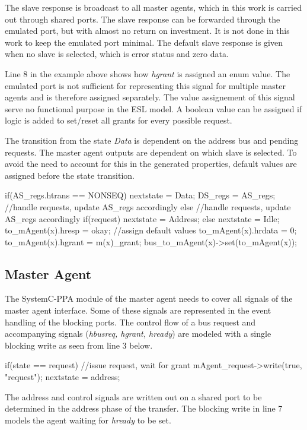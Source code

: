 The slave response is broadcast to all master agents, which in this work is carried out through shared ports. The slave response can be forwarded through the emulated port, but with almost no return on investment. It is not done in this work to keep the emulated port minimal. The default slave response is given when no slave is selected, which is error status and zero data. \par
Line 8 in the example above shows how \textit{hgrant} is assigned an enum value. The emulated port is not sufficient for representing this signal for multiple master agents and is therefore assigned separately. The value assignement of this signal serve no functional purpose in the ESL model. A boolean value can be assigned if logic is added to set/reset all grants for every possible request.  \par
The transition from the state \textit{Data} is dependent on the address bus and pending requests. The master agent outputs are dependent on which slave is selected. To avoid the need to account for this in the generated properties, default values are assigned before the state transition.   
\begin{C++}
if(AS_regs.htrans == NONSEQ){ 
 nextstate = Data;
 DS_regs = AS_regs;
 //handle requests, update AS_regs accordingly
}else{
 //handle requests, update AS_regs accordingly
 if(request) nextstate = Address;
 else nextstate = Idle;
}
to_mAgent(x).hresp = okay; //assign default values
to_mAgent(x).hrdata = 0;
to_mAgent(x).hgrant = m(x)_grant;
bus_to_mAgent(x)->set(to_mAgent(x));

\end{C++}

 

\subsection{Master Agent}
\label{sub:magent-design}
The SystemC-PPA module of the master agent needs to cover all signals of the master agent interface. Some of these signals are represented in the event handling of the blocking ports. The control flow of a bus request and accompanying signals (\textit{hbusreq, hgrant, hready}) are modeled with a single blocking write as seen from line 3 below. 
\begin{C++}
if(state == request){
  //issue request, wait for grant
  mAgent_request->write(true, "request"); 
  nextstate = address;
}
\end{C++}

The address and control signals are written out on a shared port to be determined in the address phase of the transfer. The blocking write in line 7 models the agent waiting for \textit{hready} to be set. 

